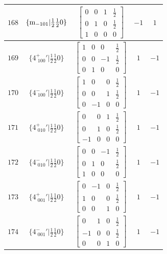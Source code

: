 \documentclass[fleqn,8pt]{jsarticle}
\begin{document}
\begin{longtable}{ccccc}
$ 168 $ & $ \{{\rm m}_{-101}|\frac{1}{2} \frac{1}{2} 0\} $ & $ \begin{bmatrix} 0 & 0 & 1 & \frac{1}{2} \\ 0 & 1 & 0 & \frac{1}{2} \\ 1 & 0 & 0 & 0 \end{bmatrix} $ & $ -1 $ & $ 1 $ \\ \hline
$ 169 $ & $ \{4^{+}_{\,\,100}{}'|\frac{1}{2} \frac{1}{2} 0\} $ & $ \begin{bmatrix} 1 & 0 & 0 & \frac{1}{2} \\ 0 & 0 & -1 & \frac{1}{2} \\ 0 & 1 & 0 & 0 \end{bmatrix} $ & $ 1 $ & $ -1 $ \\ \hline
$ 170 $ & $ \{4^{-}_{\,\,100}{}'|\frac{1}{2} \frac{1}{2} 0\} $ & $ \begin{bmatrix} 1 & 0 & 0 & \frac{1}{2} \\ 0 & 0 & 1 & \frac{1}{2} \\ 0 & -1 & 0 & 0 \end{bmatrix} $ & $ 1 $ & $ -1 $ \\ \hline
$ 171 $ & $ \{4^{+}_{\,\,010}{}'|\frac{1}{2} \frac{1}{2} 0\} $ & $ \begin{bmatrix} 0 & 0 & 1 & \frac{1}{2} \\ 0 & 1 & 0 & \frac{1}{2} \\ -1 & 0 & 0 & 0 \end{bmatrix} $ & $ 1 $ & $ -1 $ \\ \hline
$ 172 $ & $ \{4^{-}_{\,\,010}{}'|\frac{1}{2} \frac{1}{2} 0\} $ & $ \begin{bmatrix} 0 & 0 & -1 & \frac{1}{2} \\ 0 & 1 & 0 & \frac{1}{2} \\ 1 & 0 & 0 & 0 \end{bmatrix} $ & $ 1 $ & $ -1 $ \\ \hline
$ 173 $ & $ \{4^{+}_{\,\,001}{}'|\frac{1}{2} \frac{1}{2} 0\} $ & $ \begin{bmatrix} 0 & -1 & 0 & \frac{1}{2} \\ 1 & 0 & 0 & \frac{1}{2} \\ 0 & 0 & 1 & 0 \end{bmatrix} $ & $ 1 $ & $ -1 $ \\ \hline
$ 174 $ & $ \{4^{-}_{\,\,001}{}'|\frac{1}{2} \frac{1}{2} 0\} $ & $ \begin{bmatrix} 0 & 1 & 0 & \frac{1}{2} \\ -1 & 0 & 0 & \frac{1}{2} \\ 0 & 0 & 1 & 0 \end{bmatrix} $ & $ 1 $ & $ -1 $ \\ \hline

\end{longtable}
\end{document}
